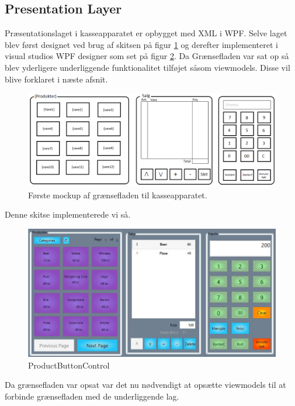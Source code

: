 
\subsection{Presentation Layer}
Præsentationslaget i kasseapparatet er opbygget med XML i WPF. Selve laget blev først designet ved brug af skitsen på figur \ref{fig:KasseMockup} og derefter implementeret i visual studios WPF designer som set på figur \ref{fig:EndeligeGUI}. Da Grænsefladen var sat op så blev yderligere underliggende funktionalitet tilføjet såsom viewmodels. Disse vil blive forklaret i næste afsnit.

\begin{figure}[H]
	\centering
	\includegraphics[width=1\textwidth]{Systemdesign/Frontend/pics/KasseMockup}
	\caption{Første mockup af grænsefladen til kasseapparatet.}
	\label{fig:KasseMockup}
\end{figure}

Denne skitse implementerede vi så.

\begin{figure}[H]
	\centering
	\includegraphics[width=1\textwidth]{Systemdesign/Frontend/pics/GUI}
	\caption{ProductButtonControl}
	\label{fig:EndeligeGUI}
\end{figure}

Da grænsefladen var opsat var det nu nødvendigt at opsætte viewmodels til at forbinde grænsefladen med de underliggende lag.









